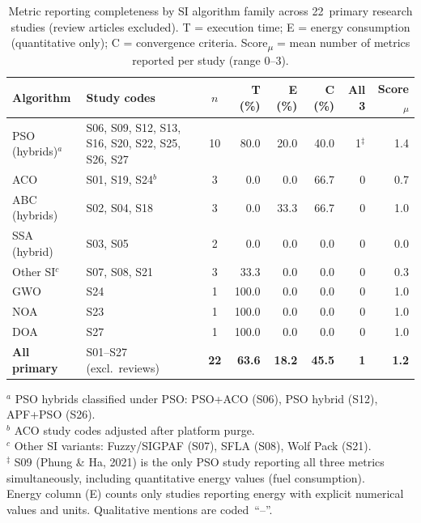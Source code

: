\documentclass[review,3p]{elsarticle}
\begin{document}
\begin{table}[htbp]
\centering
\caption{Metric reporting completeness by SI algorithm family across
22~primary research studies (review articles excluded). T = execution time;
E = energy consumption (quantitative only); C = convergence criteria.
Score\textsubscript{$\mu$} = mean number of metrics reported per study (range 0--3).}
\label{tab:metrics_by_algo}
\footnotesize
\setlength{\tabcolsep}{4pt}
\begin{tabularx}{\textwidth}{lXcrrrrr}
\toprule
\textbf{Algorithm} &
\textbf{Study codes} &
\textbf{$n$} &
\textbf{T (\%)} &
\textbf{E (\%)} &
\textbf{C (\%)} &
\textbf{All 3} &
\textbf{Score\textsubscript{$\mu$}} \\
\midrule
PSO (hybrids)$^{a}$
  & S06, S09, S12, S13, S16, S20, S22, S25, S26, S27
  & 10 & 80.0 & 20.0 & 40.0 & 1$^{\ddagger}$ & 1.4 \\
ACO
  & S01, S19, S24$^{b}$
  & 3  & 0.0  & 0.0  & 66.7 & 0 & 0.7 \\
ABC (hybrids)
  & S02, S04, S18
  & 3  & 0.0  & 33.3 & 66.7 & 0 & 1.0 \\
SSA (hybrid)
  & S03, S05
  & 2  & 0.0  & 0.0  & 0.0  & 0 & 0.0 \\
Other SI$^{c}$
  & S07, S08, S21
  & 3  & 33.3 & 0.0  & 0.0  & 0 & 0.3 \\
\midrule
GWO & S24 & 1 & 100.0 & 0.0 & 0.0  & 0 & 1.0 \\
NOA & S23 & 1 & 100.0 & 0.0 & 0.0  & 0 & 1.0 \\
DOA & S27 & 1 & 100.0 & 0.0 & 0.0  & 0 & 1.0 \\
\midrule
\textbf{All primary}
  & S01--S27 (excl.\ reviews)
  & \textbf{22} & \textbf{63.6} & \textbf{18.2} & \textbf{45.5} & \textbf{1} & \textbf{1.2} \\
\bottomrule
\end{tabularx}
\begin{minipage}{\linewidth}
\scriptsize\medskip
$^{a}$ PSO hybrids classified under PSO: PSO+ACO (S06), PSO hybrid (S12), APF+PSO (S26).\\
$^{b}$ ACO study codes adjusted after platform purge.\\
$^{c}$ Other SI variants: Fuzzy/SIGPAF (S07), SFLA (S08), Wolf Pack (S21).\\
$^{\ddagger}$ S09 (Phung \& Ha, 2021) is the only PSO study reporting all three metrics
simultaneously, including quantitative energy values (fuel consumption).\\
Energy column (E) counts only studies reporting energy with explicit numerical values
and units. Qualitative mentions are coded~``--''.
\end{minipage}
\end{table}
\end{document}

